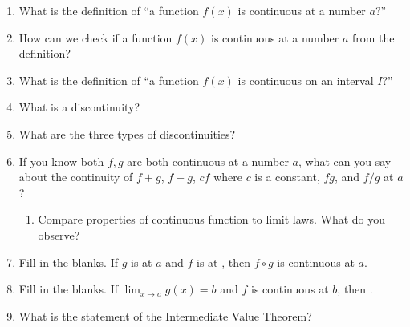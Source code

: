 \documentclass[../main.tex]{subfiles}
\begin{document}
\begin{enumerate}[label=\thesection.\arabic*, align=left]
  \item What is the definition of ``a function \(f(x)\) is continuous at a number \(a\)?''

  \item How can we check if a function \(f(x)\) is continuous at a number \(a\) from the definition?

  \item What is the definition of ``a function \(f(x)\) is continuous on an interval \(I\)?''

  \item What is a discontinuity?
    
  \item What are the three types of discontinuities? 

  \item If you know both \(f,g\) are both continuous at a number \(a\), what can you say about the continuity of \(f+g\), \(f-g\), \(cf\) where \(c\) is a constant, \(fg\), and \(f/g\) at \(a\)?
    \begin{enumerate}
    \item Compare properties of continuous function to limit laws. What do you observe?
    \end{enumerate}

  \item Fill in the blanks. If \(g\) is \underline{\phantom{XXXXXXX}} at \(a\) and \(f\) is \underline{\phantom{XXXXXXX}} at \underline{\phantom{XXX}}, then \(f \circ g\) is continuous at \(a\).

  \item Fill in the blanks. If \(\lim_{x \to a}g(x) = b\) and \(f\) is continuous at \(b\), then \underline{\phantom{XXXXXXXXXXXX}}.

  \item What is the statement of the Intermediate Value Theorem?
\end{enumerate}
\end{document}
